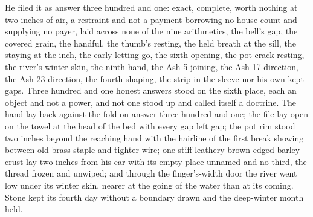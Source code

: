 He filed it as answer three hundred and one: exact, complete, worth nothing at two inches of air, a restraint and not a payment borrowing no house count and supplying no payer, laid across none of the nine arithmetics, the bell's gap, the covered grain, the handful, the thumb's resting, the held breath at the sill, the staying at the inch, the early letting-go, the sixth opening, the pot-crack resting, the river's winter skin, the ninth hand, the Ash 5 joining, the Ash 17 direction, the Ash 23 direction, the fourth shaping, the strip in the sleeve nor his own kept gaps. Three hundred and one honest answers stood on the sixth place, each an object and not a power, and not one stood up and called itself a doctrine. The hand lay back against the fold on answer three hundred and one; the file lay open on the towel at the head of the bed with every gap left gap; the pot rim stood two inches beyond the reaching hand with the hairline of the first break showing between old-brass staple and tighter wire; one stiff leathery brown-edged barley crust lay two inches from his ear with its empty place unnamed and no third, the thread frozen and unwiped; and through the finger's-width door the river went low under its winter skin, nearer at the going of the water than at its coming. Stone kept its fourth day without a boundary drawn and the deep-winter month held.
